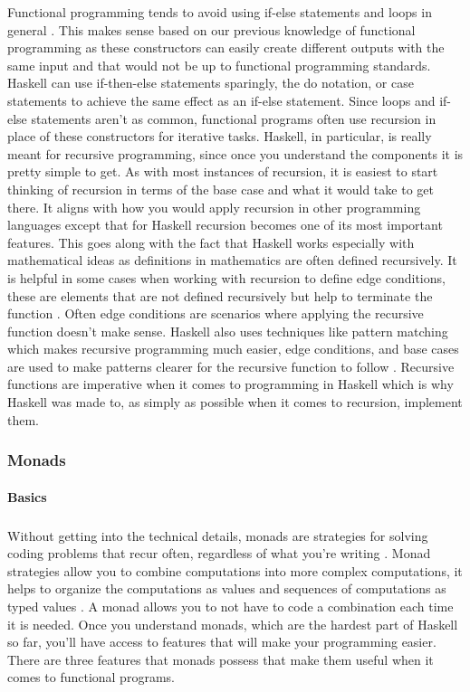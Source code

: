 \documentclass{article}
\begin{document}
Functional programming tends to avoid using if-else statements and loops in general \cite{WFP}. This makes sense based on our previous knowledge of functional programming as these constructors can easily create different outputs with the same input and that would not be up to functional programming standards. Haskell can use if-then-else statements sparingly, the do notation, or case statements to achieve the same effect as an if-else statement. Since loops and if-else statements aren't as common, functional programs often use recursion in place of these constructors for iterative tasks. Haskell, in particular, is really meant for recursive programming, since once you understand the components it is pretty simple to get. As with most instances of recursion, it is easiest to start thinking of recursion in terms of the base case and what it would take to get there. It aligns with how you would apply recursion in other programming languages except that for Haskell recursion becomes one of its most important features. This goes along with the fact that Haskell works especially with mathematical ideas as definitions in mathematics are often defined recursively. It is helpful in some cases when working with recursion to define edge conditions, these are elements that are not defined recursively but help to terminate the function \cite{R}. Often edge conditions are scenarios where applying the recursive function doesn't make sense. Haskell also uses techniques like pattern matching which makes recursive programming much easier, edge conditions, and base cases are used to make patterns clearer for the recursive function to follow \cite{R}. Recursive functions are imperative when it comes to programming in Haskell which is why Haskell was made to, as simply as possible when it comes to recursion, implement them.

\subsubsection{Monads}

\paragraph{Basics}

\subparagraph{}

Without getting into the technical details, monads are strategies for solving coding problems that recur often, regardless of what you're writing \cite{AAM}. Monad strategies allow you to combine computations into more complex computations, it helps to organize the computations as values and sequences of computations as typed values \cite{AAM}. A monad allows you to not have to code a combination each time it is needed. Once you understand monads, which are the hardest part of Haskell so far, you'll have access to features that will make your programming easier. There are three features that monads possess that make them useful when it comes to functional programs.
\end{document}
